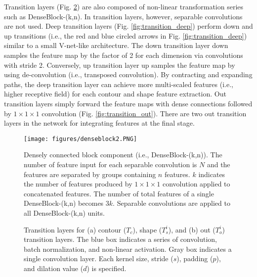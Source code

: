 \documentclass[journal]{IEEEtran}
\begin{document}
Transition layers (Fig. \ref{fig:transition}) are also composed of non-linear transformation series such as DenseBlock-(k,n). In transition layers, however, separable convolutions are not used. Deep transition layers (Fig. \ref{fig:transition_deep}) perform down and up transitions (i.e., the red and blue circled arrows in Fig. \ref{fig:transition_deep}) similar to a small V-net-like architecture. The down transition layer down samples the feature map by the factor of 2 for each dimension via convolutions with stride 2. Conversely, up transition layer up samples the feature map by using de-convolution (i.e., transposed convolution). By contracting and expanding paths, the deep transition layer can achieve more multi-scaled features (i.e., higher receptive field) for each contour and shape feature extraction. Out transition layers simply forward the feature maps with dense connections followed by $1\times1\times1$ convolution (Fig. \ref{fig:transition_out}). There are two out transition layers in the network for integrating features at the final stage.\par

\begin{figure}[t]
    \centering
    \texttt{[image: figures/denseblock2.PNG]}
    \caption{Densely connected block component (i.e., DenseBlock-(k,n)). The number of feature input for each separable convolution is $N$ and the features are separated by groups containing $n$ features. \(k\) indicates the number of features produced by $1\times1\times1$ convolution applied to concatenated features. The number of total features of a single DenseBlock-(k,n) becomes \(3k\). Separable convolutions are applied to all DenseBlock-(k,n) units.}
    \label{fig:denseblock}
\end{figure}

\begin{figure}[t]
    \centering
    \vfil
    \caption{Transition layers for (a) contour (\(T_c\)), shape (\(T^i_s\)), and (b) out (\(T^i_o\)) transition layers. The blue box indicates a series of convolution, batch normalization, and non-linear activation. Gray box indicates a single convolution layer. Each kernel size, stride ($s$), padding ($p$), and dilation value ($d$) is specified.}
    \label{fig:transition}
\end{figure}
\end{document}

